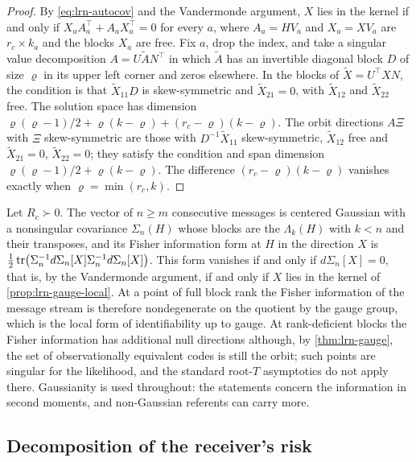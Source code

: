 \begin{proof}
By \cref{eq:lrn-autocov} and the Vandermonde argument, $X$ lies in the kernel if and only if $X_aA_a^\top+A_aX_a^\top=0$ for every $a$, where $A_a=HV_a$ and $X_a=XV_a$ are $r_c\times k_a$ and the blocks $X_a$ are free. Fix $a$, drop the index, and take a singular value decomposition $A=U\tilde AN^\top$ in which $\tilde A$ has an invertible diagonal block $D$ of size $\varrho$ in its upper left corner and zeros elsewhere. In the blocks of $\tilde X=U^\top XN$, the condition is that $\tilde X_{11}D$ is skew-symmetric and $\tilde X_{21}=0$, with $\tilde X_{12}$ and $\tilde X_{22}$ free. The solution space has dimension $\varrho(\varrho-1)/2+\varrho(k-\varrho)+(r_c-\varrho)(k-\varrho)$. The orbit directions $A\Xi$ with $\Xi$ skew-symmetric are those with $D^{-1}\tilde X_{11}$ skew-symmetric, $\tilde X_{12}$ free and $\tilde X_{21}=0$, $\tilde X_{22}=0$; they satisfy the condition and span dimension $\varrho(\varrho-1)/2+\varrho(k-\varrho)$. The difference $(r_c-\varrho)(k-\varrho)$ vanishes exactly when $\varrho=\min(r_c,k)$.
\end{proof}

Let $R_c\succ0$. The vector of $n\ge m$ consecutive messages is centered Gaussian with a nonsingular covariance $\Sigma_n(H)$ whose blocks are the $\Lambda_k(H)$ with $k<n$ and their transposes, and its Fisher information form at $H$ in the direction $X$ is $\tfrac12\operatorname{tr}\bigl(\Sigma_n^{-1}d\Sigma_n[X]\Sigma_n^{-1}d\Sigma_n[X]\bigr)$. This form vanishes if and only if $d\Sigma_n[X]=0$, that is, by the Vandermonde argument, if and only if $X$ lies in the kernel of \cref{prop:lrn-gauge-local}. At a point of full block rank the Fisher information of the message stream is therefore nondegenerate on the quotient by the gauge group, which is the local form of identifiability up to gauge. At rank-deficient blocks the Fisher information has additional null directions although, by \cref{thm:lrn-gauge}, the set of observationally equivalent codes is still the orbit; such points are singular for the likelihood, and the standard root-$T$ asymptotics do not apply there. Gaussianity is used throughout: the statements concern the information in second moments, and non-Gaussian referents can carry more.

\subsection{Decomposition of the receiver's risk}

